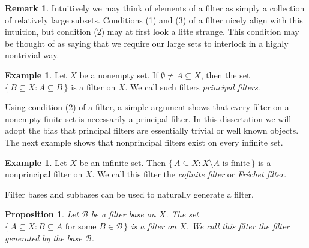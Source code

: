 \documentclass[12pt]{article}
\theoremstyle{plain}
\newtheorem{prop}[thm]{Proposition}
\theoremstyle{definition}
\newtheorem{rmk}[thm]{Remark}
\newtheorem{example}[thm]{Example}
\newcommand{\calB}{\mathcal{B}}
\begin{document}
\begin{rmk}
  Intuitively we may think of elements of a filter as simply a
  collection of relatively large subsets.
  Conditions (1) and (3) of a filter nicely align with this intuition,
  but condition (2) may at first look a litte strange.
  This condition may be thought of as saying that we require our large
  sets to interlock in a highly nontrivial way.%
\end{rmk}

\begin{example}
  \label{ex:prinFilt}
  Let $X$ be a nonempty set.
  If $\emptyset \ne A \subseteq X$, then the set $\{\, B \subseteq X :
  A \subseteq B \,\}$ is a filter on $X$.
  We call such filters \textsl{principal filters}.
\end{example}

Using condition (2) of a filter, a simple argument shows that every
filter on a nonempty finite set is necessarily a principal filter. 
In this dissertation we will adopt the bias that principal filters are
essentially trivial or well known objects. 
The next example shows that nonprincipal filters exist on every
infinite set.

\begin{example}
  Let $X$ be an infinite set.
  Then $\{\, A \subseteq X : \mbox{$X \setminus A$ is finite} \,\}$ is
  a nonprincipal filter on $X$.
  We call this filter the \textsl{cofinite filter} or
  \textsl{Fr\'{e}chet filter}.
\end{example}

Filter bases and subbases can be used to naturally generate a filter.


\begin{prop}
  \label{prop:filterB}
  Let $\calB$ be a filter base on $X$.
  The set $\{\, A \subseteq X : \mbox{$B \subseteq A$ for some $B \in
    \calB$} \,\}$ is a filter on $X$.
  We call this filter the \textsl{filter generated by the base $\calB$}.
\end{prop}
\end{document}
